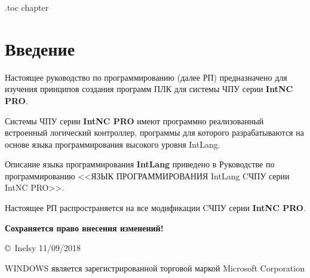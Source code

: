 
\etocsettocdepth.toc {chapter}

\chapter*{Введение}

Настоящее руководство по программированию (далее РП) предназначено для изучения  принципов создания программ ПЛК для системы \mbox{ЧПУ} серии \textbf{IntNC PRO}. 

Системы \mbox{ЧПУ} серии \textbf{IntNC PRO} имеют программно реализованный встроенный логический контроллер, программы для которого разрабатываются на основе языка программирования высокого уровня IntLang.

Описание языка программирования \textbf{IntLang} приведено в Руководстве по программированию <<ЯЗЫК ПРОГРАММИРОВАНИЯ IntLang CЧПУ серии IntNC PRO>>.


Настоящее РП распространяется на все модификации CЧПУ серии \textbf{IntNC PRO}. \killoverfullbefore \BL

\textbf{Сохраняется право внесения изменений!}

\BL\BL\BL

\copyright\ Inelsy 11/09/2018

\BL

WINDOWS является зарегистрированной торговой маркой Microsoft Corporation

\newpage